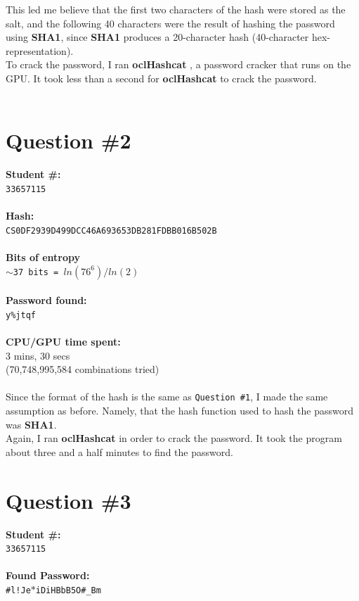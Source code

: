 \documentclass[conference]{IEEEtran}
\begin{document}
This led me believe that the first two characters of the hash were stored as the salt, and the following 40 characters were the result of hashing the password using \textbf{SHA1}, since \textbf{SHA1} produces a 20-character hash (40-character hex-representation). \\

To crack the password, I ran \textbf{oclHashcat} \cite{oclHashcat}, a password cracker that runs on the GPU. It took less than a second for \textbf{oclHashcat} to crack the password.\\\\

\newpage

\section{Question \#2}
\noindent\textbf{Student \#:}\\
\texttt{33657115}
\\\\
\textbf{Hash:}\\
\texttt{CS0DF2939D499DCC46A693653DB281FDBB016B502B}\\\\
\textbf{Bits of entropy}\\
\texttt{$\sim$37 bits = $ln(76^6)/ln(2)$}\\\\
\textbf{Password found:}\\
\texttt{y\%jtqf}\\\\
\textbf{CPU/GPU time spent:}\\
3 mins, 30 secs\\
(70,748,995,584 combinations tried)
\\\\

Since the format of the hash is the same as \texttt{Question \#1}, I made the same assumption as before. Namely, that the hash function used to hash the password was \textbf{SHA1}.\\

Again, I ran \textbf{oclHashcat} in order to crack the password. It took the program about three and a half minutes to find the password.

\newpage

\section{Question \#3}
\noindent\textbf{Student \#:}\\
\texttt{33657115}
\\\\
\textbf{Found Password:}\\
\texttt{\#l!Je$*$iDiHBbB5O\#\_Bm}\\\\
\end{document}
